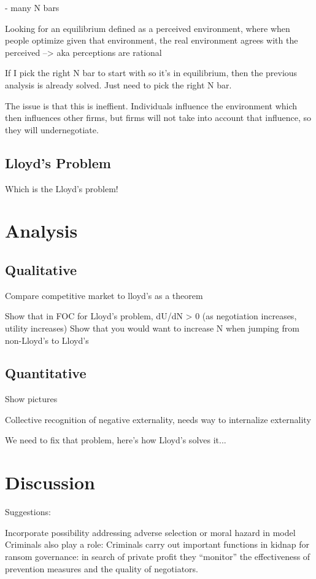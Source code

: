 \documentclass[12pt]{article}
\begin{document}
- many N bars

Looking for an equilibrium defined as a perceived environment, where when people optimize given that environment, the real environment agrees with the perceived --> aka perceptions are rational

If I pick the right N bar to start with so it's in equilibrium, then the previous analysis is already solved. Just need to pick the right N bar. 

The issue is that this is ineffient. Individuals influence the environment which then influences other firms, but firms will not take into account that influence, so they will undernegotiate.

\subsection{Lloyd's Problem}

Which is the Lloyd's problem! 

\section{Analysis}

\subsection{Qualitative}

Compare competitive market to lloyd's as a theorem

Show that in FOC for Lloyd's problem, dU/dN > 0 (as negotiation increases, utility increases)
Show that you would want to increase N when jumping from non-Lloyd's to Lloyd's

\subsection{Quantitative}

Show pictures

Collective recognition of negative externality, needs way to internalize externality

We need to fix that problem, here's how Lloyd's solves it...

\section{Discussion}

Suggestions:

Incorporate possibility addressing adverse selection or moral hazard in model
Criminals also play a role:
Criminals carry out important functions in kidnap for ransom governance: in search of private profit they “monitor” the effectiveness of prevention measures and the quality of negotiators.
\end{document}
